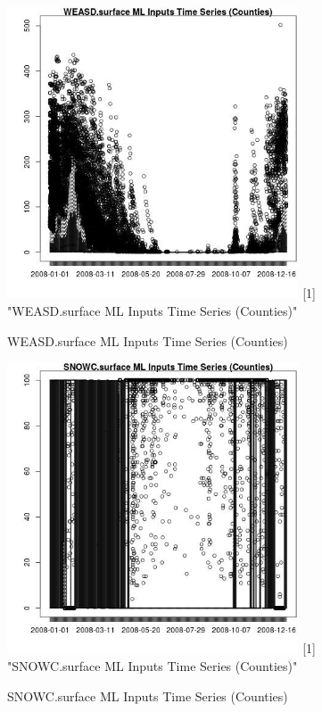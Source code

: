 \begin{figure} 
\centering  
\includegraphics[width=0.77\textwidth]{Code_Outputs/ML_input_report_ML_input_CountyGeometricCentroids_Locations_Dates_part_c_2008-01-01to2008-12-31_WEASD.surfaceTS.jpg} 
[1] "WEASD.surface ML Inputs Time Series (Counties)"
\caption{\label{fig:ML_input_report_ML_input_CountyGeometricCentroids_Locations_Dates_part_c_2008-01-01to2008-12-31WEASD.surfaceTS}WEASD.surface ML Inputs Time Series (Counties)} 
\end{figure} 
 

\begin{figure} 
\centering  
\includegraphics[width=0.77\textwidth]{Code_Outputs/ML_input_report_ML_input_CountyGeometricCentroids_Locations_Dates_part_c_2008-01-01to2008-12-31_SNOWC.surfaceTS.jpg} 
[1] "SNOWC.surface ML Inputs Time Series (Counties)"
\caption{\label{fig:ML_input_report_ML_input_CountyGeometricCentroids_Locations_Dates_part_c_2008-01-01to2008-12-31SNOWC.surfaceTS}SNOWC.surface ML Inputs Time Series (Counties)} 
\end{figure} 
 

